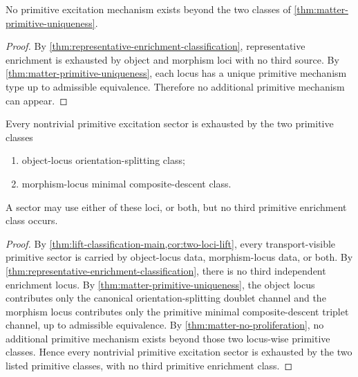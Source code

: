 \begin{theorem}
\label{thm:matter-no-proliferation}
No primitive excitation mechanism exists beyond the two classes of
\cref{thm:matter-primitive-uniqueness}.
\end{theorem}

\begin{proof}
By \cref{thm:representative-enrichment-classification}, representative
enrichment is exhausted by object and morphism loci with no third source.
By \cref{thm:matter-primitive-uniqueness}, each locus has a unique
primitive mechanism type up to admissible equivalence.
Therefore no additional primitive mechanism can appear.
\end{proof}

\begin{theorem}
\label{thm:matter-excitation-dichotomy}
Every nontrivial primitive excitation sector is exhausted by the two
primitive classes
\begin{enumerate}[label=\textup{(\roman*)}]
\item object-locus orientation-splitting class;
\item morphism-locus minimal composite-descent class.
\end{enumerate}
A sector may use either of these loci, or both, but no third
primitive enrichment class occurs.
\end{theorem}

\begin{proof}
By \cref{thm:lift-classification-main,cor:two-loci-lift}, every
transport-visible primitive sector is carried by object-locus data,
morphism-locus data, or both.
By \cref{thm:representative-enrichment-classification}, there is no
third independent enrichment locus.
By \cref{thm:matter-primitive-uniqueness}, the object locus
contributes only the canonical orientation-splitting doublet channel
and the morphism locus contributes only the primitive minimal
composite-descent triplet channel, up to admissible equivalence.
By \cref{thm:matter-no-proliferation}, no additional primitive
mechanism exists beyond those two locus-wise primitive classes.
Hence every nontrivial primitive excitation sector is exhausted by
the two listed primitive classes, with no third primitive
enrichment class.
\end{proof}

